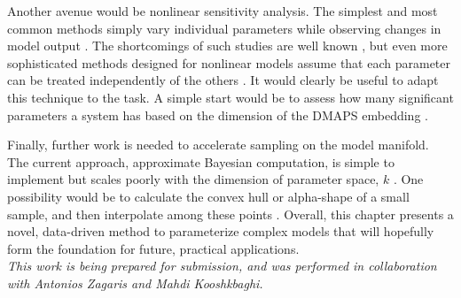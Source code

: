 Another avenue would be nonlinear sensitivity analysis. The
simplest and most common methods simply vary individual parameters
while observing changes in model output
\cite{murphy_quantification_2004}. The shortcomings of such studies
are well known \cite{saltelli_how_2010},
but even more sophisticated methods designed for nonlinear models
assume that each parameter can be treated independently of the
others \cite{cukier_nonlinear_1978}. It would clearly be useful to
adapt this technique to the task. A simple start would be to assess
how many significant parameters a system has based on the dimension of
the DMAPS embedding \cite{dsilva_parsimonious_2015}.

Finally, further work is needed to accelerate sampling on the model
manifold. The current approach, approximate Bayesian computation, is
simple to implement but scales poorly with the dimension of parameter
space, $k$ \cite{turner_tutorial_2012}. One possibility would be to
calculate the convex hull or alpha-shape of a small sample, and then
interpolate among these points
\cite{barber_quickhull_1996,edelsbrunner_three-dimensional_1994}. Overall,
this chapter presents a novel, data-driven method to parameterize
complex models that will hopefully form the foundation for future,
practical applications. \\

\textit{This work is being prepared for submission, and was performed
  in collaboration with Antonios Zagaris and Mahdi Kooshkbaghi.}


